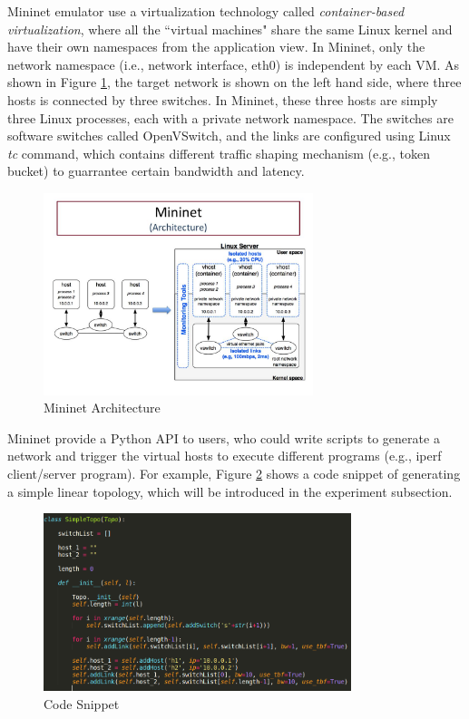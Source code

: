 \documentclass[12pt]{article}
\begin{document}
Mininet emulator use a virtualization technology called \textit{container-based virtualization}, where all the ``virtual machines" share the same Linux kernel and have their own namespaces from the application view. In Mininet, only the network namespace (i.e., network interface, eth0) is independent by each VM. As shown in Figure \ref{fig:mininet}, the target network is shown on the left hand side, where three hosts is connected by three switches. In Mininet, these three hosts are simply three Linux processes, each with a private network namespace. The switches are software switches called OpenVSwitch, and the links are configured using Linux \textit{tc} command, which contains different traffic shaping mechanism (e.g., token bucket) to guarrantee certain bandwidth and latency.

\begin{figure}
  \centering
  \includegraphics[width=0.7\textwidth]{mininet.jpg}
  \caption{Mininet Architecture}
  \label{fig:mininet}
\end{figure}  

Mininet provide a Python API to users, who could write scripts to generate a network and trigger the virtual hosts to execute different programs (e.g., iperf client/server program). For example, Figure \ref{fig:script} shows a code snippet of generating a simple linear topology, which will be introduced in the experiment subsection.

\begin{figure}
  \centering
  \includegraphics[width=0.8\textwidth]{script.png}
  \caption{Code Snippet}
  \label{fig:script}
\end{figure}
\end{document}
